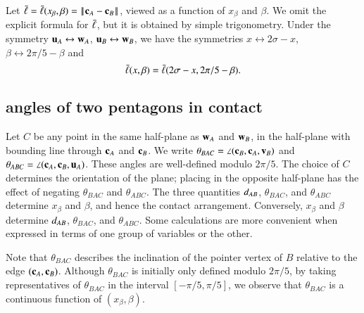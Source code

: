 

Let $\bl = \bl(x_\beta,\beta) = \norm{\c_A}{\c_B}$, viewed as a
function of $x_\beta$ and $\beta$.  We omit the explicit formula for
$\bar\ell$, but it is obtained by simple trigonometry.  Under the symmetry
${\mathbf u}_A\leftrightarrow {\mathbf w}_A$, ${\mathbf u}_B\leftrightarrow{\mathbf w}_B$, we have the
symmetries $x\leftrightarrow 2\sigma-x$, $\beta\leftrightarrow
2\pi/5-\beta$ and
\[
\bar\ell(x,\beta) = \bar\ell(2\sigma-x,2\pi/5 - \beta).
\]

\subsection{angles of two pentagons in contact}\label{sec:xalpha}

Let $C$ be any point in the same half-plane as ${\mathbf w}_A$ and ${\mathbf w}_B$, in
the half-plane with bounding line through ${\mathbf c}_A$ and ${\mathbf c}_B$.  We write
$\theta_{BAC} = \angle ({\mathbf c}_B,{\mathbf c}_A,{\mathbf v}_B)$ and $\theta_{ABC} =
\angle({\mathbf c}_A,{\mathbf c}_B,{\mathbf u}_A)$.  These angles are well-defined modulo
$2\pi/5$.  The choice of $C$ determines the orientation of the plane;
placing in the opposite half-plane has the effect of negating
$\theta_{BAC}$ and $\theta_{ABC}$.  The three quantities $d_{AB}$,
$\theta_{BAC}$, and $\theta_{ABC}$ determine $x_\beta$ and $\beta$,
and hence the contact arrangement.  Conversely, $x_\beta$ and $\beta$
determine $d_{AB}$, $\theta_{BAC}$, and $\theta_{ABC}$.  Some
calculations are more convenient when expressed in terms of one group
of variables or the other.

Note that $\theta_{BAC}$ describes the inclination of the pointer
vertex of $B$ relative to the edge $({\mathbf c}_A,{\mathbf c}_B)$.  Although
$\theta_{BAC}$ is initially only defined modulo $2\pi/5$, by taking
representatives of $\theta_{BAC}$ in the interval $[-\pi/5,\pi/5]$, we
observe that $\theta_{BAC}$ is a continuous function of
$(x_\beta,\beta)$.

